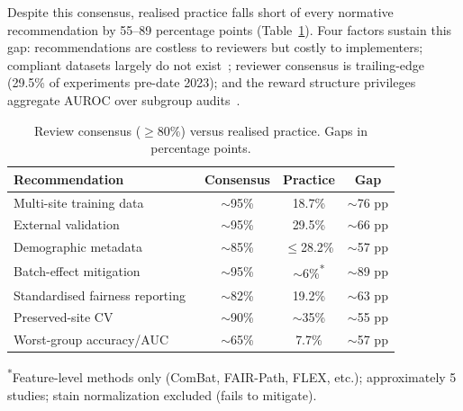 Despite this consensus, realised practice falls short of every normative recommendation by 55--89 percentage points (Table~\ref{tab:consensus_vs_practice}). Four factors sustain this gap: recommendations are costless to reviewers but costly to implementers; compliant datasets largely do not exist~\citep{norori2021addressing, ceccon2025underrepresentation}; reviewer consensus is trailing-edge (29.5\% of experiments pre-date 2023); and the reward structure privileges aggregate AUROC over subgroup audits~\citep{cheng2021challenges, chen2023algorithmic, yang2024survey}.

\begin{table}[htbp]
  \centering
  \caption{Review consensus ($\geq 80\%$) versus realised practice.
           Gaps in percentage points.}
  \label{tab:consensus_vs_practice}
  \small
  \begin{tabularx}{\linewidth}{@{}X c c c@{}}
    \toprule
    \textbf{Recommendation} & \textbf{Consensus} &
      \textbf{Practice} & \textbf{Gap} \\
    \midrule
    Multi-site training data~\citep{riccilara2022addressing, montezuma2025unbiased, howard2021site}
      & $\sim$95\% & 18.7\% & $\sim$76 pp \\
    External validation~\citep{montezuma2025unbiased, chen2023algorithmic, lin2025contrastive}
      & $\sim$95\% & 29.5\% & $\sim$66 pp \\
    Demographic metadata~\citep{chen2023algorithmic, sounderajah2021stardai, vaidya2024demographic}
      & $\sim$85\% & $\leq$28.2\% & $\sim$57 pp \\
    Batch-effect mitigation~\citep{komen2024batch, chinta2025aidriven, murchan2024combat}
      & $\sim$95\% & $\sim$6\%\textsuperscript{*} & $\sim$89 pp \\
    Standardised fairness reporting~\citep{sounderajah2021stardai, chen2023algorithmic, zong2023medfair}
      & $\sim$82\% & 19.2\% & $\sim$63 pp \\
    Preserved-site CV~\citep{howard2021site, chinta2025aidriven, kheiri2025investigation}
      & $\sim$90\% & $\sim$35\% & $\sim$55 pp \\
    Worst-group accuracy/AUC~\citep{zong2023medfair, chen2023algorithmic, soltan2024challenges}
      & $\sim$65\% & 7.7\% & $\sim$57 pp \\
    \bottomrule
  \end{tabularx}
  \textsuperscript{*}Feature-level methods only (ComBat, FAIR-Path, FLEX, etc.); approximately 5 studies; stain normalization excluded (fails to mitigate).
\end{table}

